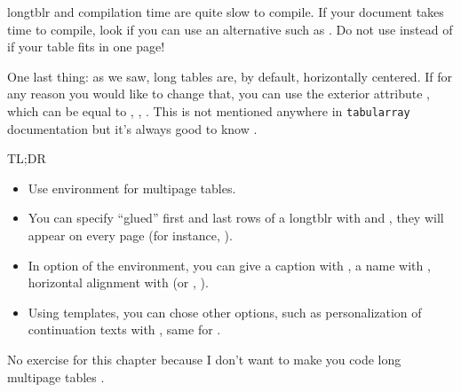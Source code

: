 \begin{warningbox}{longtblr and compilation time}
	 are quite slow to compile. If your document takes time to compile, look if you can use an alternative such as . Do not use  instead of  if your table fits in one page!
\end{warningbox}

One last thing: as we saw, long tables are, by default, horizontally centered. If for any reason you would like to change that, you can use the exterior attribute , which can be equal to , , . This is not mentioned anywhere in \texttt{tabularray} documentation but it's always good to know .


\begin{infobox}{TL;DR}
	\begin{itemize}
		\item Use  environment for multipage tables.
		\item You can specify ``glued'' first and last rows of a longtblr with  and , they will appear on every page (for instance, ).
		\item In option of the  environment, you can give a caption with , a name with , horizontal alignment with  (or , ).
		\item Using templates, you can chose other options, such as personalization of continuation texts with , same for .
	\end{itemize}

No exercise for this chapter because I don't want to make you code long multipage tables .
\end{infobox}
